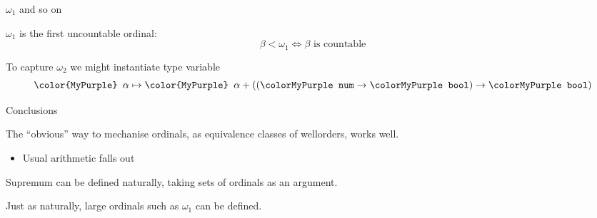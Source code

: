 \documentclass[xetex,14pt]{beamer}
\newcommand{\ty}[1]{\texttt{\color{MyPurple} #1}}
\begin{document}
\begin{frame}{$\omega_1$ and so on}

$\omega_1$ is the first uncountable ordinal:
\[
\beta < \omega_1 \iff \beta \mbox{ is countable}
\]

\bigskip
To capture $\omega_2$ we might instantiate type variable
\[
\ty{$\alpha$} \mapsto \ty{$\alpha + ((\num\to\bool)\to\bool)$}
\]

\end{frame}

\begin{frame}{Conclusions}

The “obvious” way to mechanise ordinals, as equivalence classes of wellorders, works well.
\begin{itemize}
\item Usual arithmetic falls out
\end{itemize}

\bigskip
Supremum can be defined naturally, taking sets of ordinals as an argument.

\bigskip
Just as naturally, large ordinals such as $\omega_1$ can be defined.

\end{frame}
\end{document}
